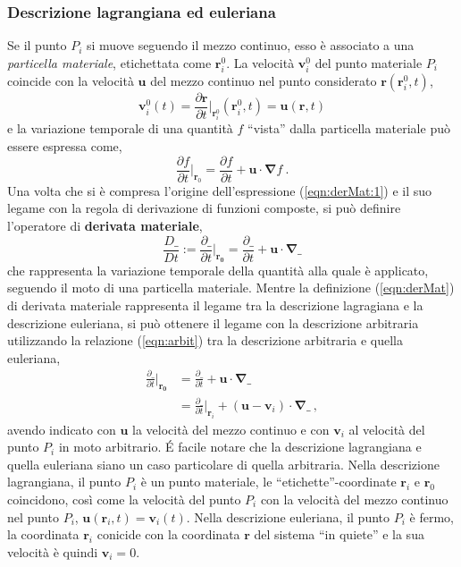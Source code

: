 \subsubsection{Descrizione lagrangiana ed euleriana}
Se il punto $P_i$ si muove seguendo il mezzo continuo, esso è associato a una \textit{particella materiale}, etichettata come $\bm{r}^0_i$. La velocità $\bm{v}^0_i$ del punto materiale $P_i$ coincide con la velocità $\bm{u}$ del mezzo continuo nel punto considerato $\bm{r}(\bm{r}^0_i, t)$,
\begin{equation}
  \bm{v}^0_i(t) = \dfrac{\partial \bm{r}}{\partial t}\bigg|_{\bm{r}^0_i} (\bm{r}^0_i, t) = \bm{u}(\bm{r}, t)
\end{equation}
e la variazione temporale di una quantità $f$ ``vista'' dalla particella materiale può essere espressa come,
\begin{equation}\label{eqn:derMat:1}
    \frac{\partial f}{\partial t}\bigg|_{\bm{r}_0} = \frac{\partial f}{\partial t} + \bm{u} \cdot \bm{\nabla} f \ .
\end{equation}
Una volta che si è compresa l'origine dell'espressione (\ref{eqn:derMat:1}) e il suo legame con la regola di derivazione di funzioni composte, si può definire l'operatore di  \textbf{derivata materiale},
\begin{equation}\label{eqn:derMat}
  \frac{D \_}{D t} := \frac{\partial \_}{\partial t}\bigg|_{\bm{r_0}} =
  \frac{\partial \_}{\partial t} + \bm{u} \cdot \bm{\nabla} \_
\end{equation}
che rappresenta la variazione temporale della quantità alla quale è applicato, seguendo il moto di una particella materiale.
%
Mentre la definizione (\ref{eqn:derMat}) di derivata materiale rappresenta il legame tra la descrizione lagragiana e la descrizione euleriana, si può ottenere il legame con la descrizione arbitraria utilizzando la relazione (\ref{eqn:arbit}) tra la descrizione arbitraria e quella euleriana,
\begin{equation}
\begin{aligned}
    \frac{\partial \_}{\partial t}\bigg|_{\bm{r_0}} & =
  \frac{\partial \_}{\partial t} + \bm{u} \cdot \bm{\nabla} \_ \\
  & =
  \frac{\partial \_}{\partial t}\bigg|_{\bm{r}_i} + \left( \bm{u} - \bm{v}_i \right) \cdot \bm{\nabla} \_ \ ,
\end{aligned}
\end{equation}
avendo indicato con $\bm{u}$ la velocità del mezzo continuo e con $\bm{v}_i$ al velocità del punto $P_i$ in moto arbitrario. \'E facile notare che la descrizione lagrangiana e quella euleriana siano un caso particolare di quella arbitraria. Nella descrizione lagrangiana, il punto $P_i$ è un punto materiale, le ``etichette''-coordinate $\bm{r}_i$ e $\bm{r}_0$ coincidono, così come la velocità del punto $P_i$ con la velocità del mezzo continuo nel punto $P_i$, $\bm{u}(\bm{r}_i, t) = \bm{v}_i (t)$. Nella descrizione euleriana, il punto $P_i$ è fermo, la coordinata $\bm{r}_i$ conicide con la coordinata $\bm{r}$ del sistema ``in quiete'' e la sua velocità è quindi $\bm{v}_i = 0$.

